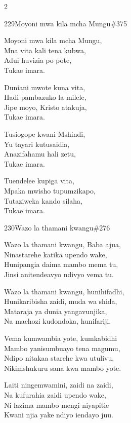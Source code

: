 \documentclass{article}
\begin{document}
\begin{multicols}{2}
\begin{hymn}{229}{Moyoni mwa kila mcha Mungu}{\#375}
\begin{stanza}
Moyoni mwa kila mcha Mungu,\\
Mna vita kali tena kubwa,\\
Adui huvizia po pote,\\
Tukae imara.
\end{stanza}
\begin{stanza}
Duniani mwote kuna vita,\\
Hadi pambazuko la milele,\\
Jipe moyo, Kristo atakuja,\\
Tukae imara.
\end{stanza}
\begin{stanza}
Tusiogope kwani Mshindi,\\
Yu tayari kutusaidia,\\
Anazifahamu hali zetu,\\
Tukae imara.
\end{stanza}
\begin{stanza}
Tuendelee kupiga vita,\\
Mpaka mwisho tupumzikapo,\\
Tutaziweka kando silaha,\\
Tukae imara.
\end{stanza}
\end{hymn}

\begin{hymn}{230}{Wazo la thamani kwangu}{\#276}
\begin{stanza}
Wazo la thamani kwangu, Baba ajua,\\
Ninastarehe katika upendo wake,\\
Hunipangia daima mambo mema tu,\\
Jinsi anitendeavyo ndivyo vema tu.
\end{stanza}
\begin{stanza}
Wazo la thamani kwangu, hunihifadhi,\\
Hunikaribisha zaidi, muda wa shida,\\
Mataraja ya dunia yangavunjika,\\
Na machozi kudondoka, hunifariji.
\end{stanza}
\begin{stanza}
Vema kumwambia yote, kumkabidhi\\
Mambo yanisumbuayo tena magumu,\\
Ndipo nitakaa starehe kwa utulivu,\\
Nikimshukuru sana kwa mambo yote.
\end{stanza}
\begin{stanza}
Laiti ningemwamini, zaidi na zaidi,\\
Na kufurahia zaidi upendo wake,\\
Ni lazima mambo mengi niyapitie\\
Kwani njia yake ndiyo iendayo juu.
\end{stanza}
\end{hymn}


\end{multicols}
\end{document}
